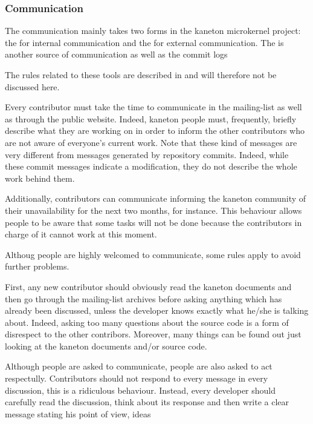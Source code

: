 
\subsubsection{Communication}

The communication mainly takes two forms in the kaneton microkernel project:
the  for internal communication and the  for external communication. The  is another
source of communication as well as the commit logs \etc{}

The rules related to these tools are described in  and will therefore not be discussed here.

Every contributor must take the time to communicate in the mailing-list as well
as through the public website. Indeed, kaneton people must, frequently,
briefly describe what they are working on in order to inform the other
contributors who are not aware of everyone's current work. Note that these
kind of messages are very different from messages generated by repository
commits. Indeed, while these commit messages indicate a modification, they
do not describe the whole work behind them.

Additionally, contributors can communicate informing the kaneton community of
their unavailability for the next two months, for instance. This behaviour
allows people to be aware that some tasks will not be done because the
contributors in charge of it cannot work at this moment.

Althoug people are highly welcomed to communicate, some rules apply to
avoid further problems.

First, any new contributor should obviously read the kaneton documents and
then go through the mailing-list archives before asking anything which has
already been discussed, unless the developer knows exactly what he/she is
talking about. Indeed, asking too many questions about the source code is a
form of disrespect to the other contribors. Moreover, many things can be
found out just looking at the kaneton documents and/or source code.

Although people are asked to communicate, people are also asked to act
respectully. Contributors should not respond to every message in every
discussion, this is a ridiculous behaviour. Instead, every developer should
carefully read the discussion, think about its response and then write a clear
message stating his point of view, ideas \etc{}

